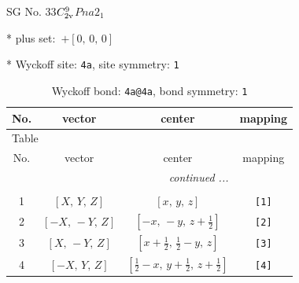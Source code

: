 \documentclass[fleqn,8pt]{jsarticle}
\begin{document}
\setcounter{MaxMatrixCols}{32}

\renewcommand{\tablename}{Table~}
\renewcommand{\figurename}{Figure~}
\begin{center}
\LARGE
SG No. 33\quad$C_{\rm 2v}^{9}$\quad$Pna2_1$\quad[ orthorhombic ]
\end{center}

* plus set:\,\,\,$+\left[ 0,\, 0,\, 0 \right]$


* Wyckoff site: {\tt 4a}, site symmetry: {\tt 1}
\renewcommand{\arraystretch}{1.2}
\begin{longtable}{cccc}
\caption{Wyckoff bond: {\tt 4a@4a}, bond symmetry: {\tt 1}}
 \\
 \hline \hline
No. & vector & center & mapping \\ \hline \endfirsthead

\multicolumn{3}{l}{\tablename\ \thetable{}} \\
 \hline \hline
No. & vector & center & mapping \\ \hline \endhead

 \hline \hline
\multicolumn{3}{r}{\footnotesize\it continued ...} \\ \endfoot

 \hline \hline
\multicolumn{3}{r}{} \\ \endlastfoot

1 & $\left[ X,\, Y,\, Z \right]$ & $\left[ x,\, y,\, z \right]$ & {\tt [1]} \\ \hline
2 & $\left[ - X,\, - Y,\, Z \right]$ & $\left[ - x,\, - y,\, z + \frac{1}{2} \right]$ & {\tt [2]} \\ \hline
3 & $\left[ X,\, - Y,\, Z \right]$ & $\left[ x + \frac{1}{2},\, \frac{1}{2} - y,\, z \right]$ & {\tt [3]} \\ \hline
4 & $\left[ - X,\, Y,\, Z \right]$ & $\left[ \frac{1}{2} - x,\, y + \frac{1}{2},\, z + \frac{1}{2} \right]$ & {\tt [4]} \\
\end{longtable}
\end{document}
